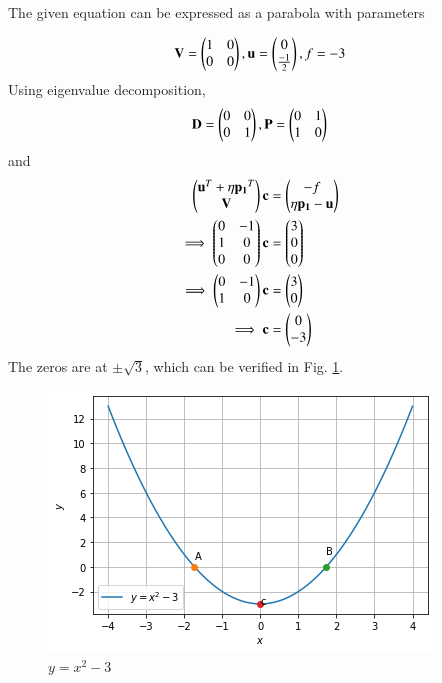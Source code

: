 The given equation can be expressed as a parabola with parameters

\begin{align}
\mathbf{V} = \begin{pmatrix}1 & 0 \\ 0 & 0\end{pmatrix},\mathbf{u}=\begin{pmatrix}0 \\ \frac{-1}{2}\end{pmatrix},f = -3
\end{align}
Using eigenvalue decomposition,
\begin{align}
\mathbf{D} = \begin{pmatrix}0 & 0\\0 & 1\end{pmatrix} ,\mathbf{P}=\begin{pmatrix}0 & 1\\1 & 0\end{pmatrix}
\end{align}
and
\begin{align}
\begin{pmatrix}\mathbf{u}^T + \eta\mathbf{p_1}^T \\ \mathbf{V}\end{pmatrix}\mathbf{c} &= \begin{pmatrix}-f \\ \eta\mathbf{p_1}-\mathbf{u}\end{pmatrix} 
\\
\implies \begin{pmatrix}0 & -1 \\ 1 & 0 \\ 0 & 0\end{pmatrix}\mathbf{c} &= \begin{pmatrix}3 \\ 0 \\ 0\end{pmatrix} \\
\implies  \begin{pmatrix}0 & -1 \\ 1 & 0\end{pmatrix}\mathbf{c} &= \begin{pmatrix}3 \\ 0\end{pmatrix}
\\
\implies \mathbf{c} &= \begin{pmatrix}0\\-3\end{pmatrix}
\end{align}
%
The zeros are at $\pm \sqrt{3}$, which can be verified in Fig. \ref{quadform/2/19/dex3}.	
\begin{figure}[!ht]
\centering
\includegraphics[width=\columnwidth]{solutions/su2021/2/19/d/download (3).png}
\caption{$y=x^2-3$}
\label{quadform/2/19/dex3}	
\end{figure}
